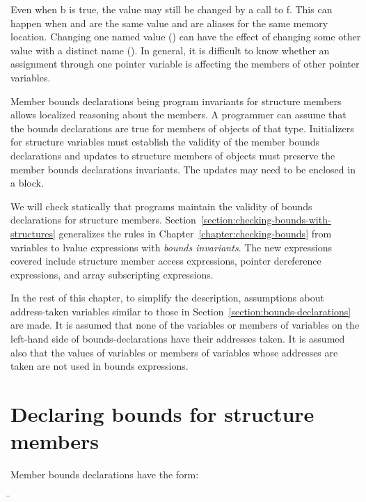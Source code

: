 Even when b is true, the value  may still be
changed by a call to f. This can happen when  and 
are the same value and are aliases for the same memory location.
Changing one named value () can have the
effect of changing some other value with a distinct name
(). In general, it is difficult to know
whether an assignment through one pointer variable is affecting the
members of other pointer variables.

Member bounds declarations being program invariants for structure members allows
localized reasoning about the members. A programmer can assume that the
bounds declarations are true for members of objects of that type.   Initializers for
structure variables must establish the validity of the member bounds declarations and
updates to structure members of objects must preserve the member bounds
declarations invariants.  The updates may need to be enclosed in a 
 block.

We will check statically that programs maintain the validity of bounds
declarations for structure members.   
Section~\ref{section:checking-bounds-with-structures} generalizes
the rules in Chapter~\ref{chapter:checking-bounds} from variables
to lvalue expressions with {\em bounds invariants}.  The new
expressions covered include structure member access expressions, 
pointer dereference expressions, and array subscripting expressions.   

In the rest of this chapter, to simplify the description, assumptions
about address-taken variables similar to those in
Section~\ref{section:bounds-declarations} are made.
It is assumed that none of the variables or members of variables on the
left-hand side of bounds-declarations have their addresses taken. It is
assumed also that the values of variables or members of variables whose
addresses are taken are not used in bounds expressions.

\section{Declaring bounds for structure members}

Member bounds declarations have the form:
\begin{tabbing}
\=\\
\>  \code{:}  \\
\\
\\
\>  \\
\>   
\end{tabbing}

